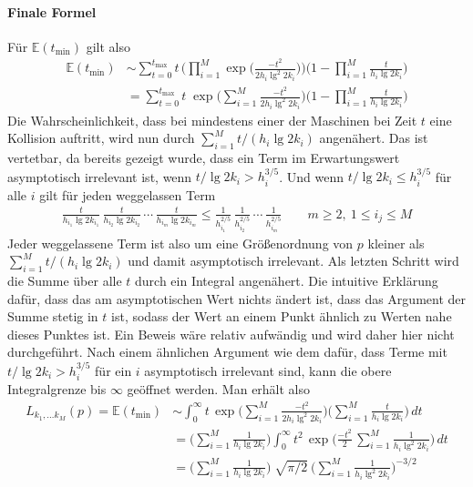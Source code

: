 \documentclass[a4paper, 10pt, ngerman]{article}
\newcommand{\E}{\mathbb{E}}
\begin{document}
\paragraph*{Finale Formel} Für $\E(t_{\min})$ gilt also
\begin{align*}
    \E(t_{\min})
     & \sim \sum_{t = 0}^{t_{\max}} t \, \Bigg ( \prod_{i = 1}^M \exp \bigg (\frac {-t^2} {2h_i \lg^2 2k_i} \bigg ) \Bigg ) \Bigg (1 - \prod_{i = 1}^M \frac {t} {h_i \lg 2k_i} \Bigg ) \\
     & = \sum_{t = 0}^{t_{\max}} t \; \exp \Bigg ( \sum_{i = 1}^M \frac {-t^2} {2h_i \lg^2 2k_i} \Bigg ) \Bigg (1 - \prod_{i = 1}^M \frac {t} {h_i \lg 2k_i} \Bigg )
\end{align*}
Die Wahrscheinlichkeit, dass bei mindestens einer der Maschinen bei Zeit $t$ eine Kollision auftritt, wird nun durch $\sum_{i = 1}^M t/(h_i \lg 2k_i)$ angenähert. Das ist vertetbar, da bereits gezeigt wurde, dass ein Term im Erwartungswert asymptotisch irrelevant ist, wenn $t/\lg 2k_i > h_i^{3/5}$. Und wenn $t / \lg 2k_i \le h_i^{3/5}$ für alle $i$ gilt für jeden weggelassen Term
\begin{align*}
    \frac {t} {h_{i_1} \lg 2k_{i_1}} \, \frac {t} {h_{i_2} \lg 2k_{i_2}} \, \cdots \, \frac {t} {h_{i_m} \lg 2k_{i_m}}
    \le \frac 1 {h_{i_1}^{2/5}} \, \frac 1 {h_{i_2}^{2/5}} \, \cdots \, \frac 1 {h_{i_m}^{2/5}} \qquad m \ge 2, \ 1 \le i_j \le M
\end{align*}
Jeder weggelassene Term ist also um eine Größenordnung von $p$ kleiner als $\sum_{i = 1}^M t/(h_i \lg 2k_i)$ und damit asymptotisch irrelevant. Als letzten Schritt wird die Summe über alle $t$ durch ein Integral angenähert. Die intuitive Erklärung dafür, dass das am asymptotischen Wert nichts ändert ist, dass das Argument der Summe stetig in $t$ ist, sodass der Wert an einem Punkt ähnlich zu Werten nahe dieses Punktes ist. Ein Beweis wäre relativ aufwändig und wird daher hier nicht durchgeführt. Nach einem ähnlichen Argument wie dem dafür, dass Terme mit $t/\lg 2k_i > h_i^{3/5}$ für ein $i$ asymptotisch irrelevant sind, kann die obere Integralgrenze bis $\infty$ geöffnet werden. Man erhält also
\begin{align}
    L_{k_1, \dots k_M}(p) = \E(t_{\min})
     & \sim \int_{0}^{\infty} t \, \exp \Bigg ( \sum_{i = 1}^M \frac {-t^2} {2h_i \lg^2 2k_i} \Bigg ) \Bigg (\sum_{i = 1}^M \frac {t} {h_i \lg 2k_i} \Bigg ) \, dt \nonumber      \\
     & = \Bigg (\sum_{i = 1}^M \frac 1 {h_i \lg 2k_i} \Bigg ) \int_0^\infty t^2 \, \exp \Bigg ( \frac {-t^2} 2 \, \sum_{i = 1}^M \frac 1 {h_i \lg^2 2k_i} \Bigg ) \, dt \nonumber \\
     & = \Bigg (\sum_{i = 1}^M \frac 1 {h_i \lg 2k_i} \Bigg ) \; \sqrt {\pi / 2}  \ \Bigg ( \sum_{i = 1}^M \frac 1 {h_i \lg^2 2k_i} \Bigg )^{-3/2} \label{lkp}
\end{align}
\end{document}
